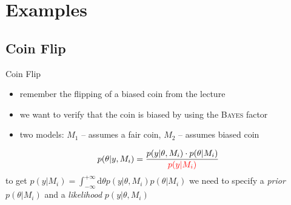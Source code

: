 \documentclass[11pt,aspectratio=1610,dvipsnames]{beamer}
\begin{document}
\section{Examples}

\subsection{Coin Flip}
\begin{frame}{Coin Flip }
	\begin{itemize}
		\item remember the flipping of a biased coin from the lecture
		\item we want to verify that the coin is biased by using the \textsc{Bayes} factor
		\item two models: $M_1$ -- assumes a fair coin, $M_2$ -- assumes biased coin
	\end{itemize}
	\begin{tcolorbox}[colback=black!5,colframe=gray!15!black,title=Posterior of the coin flip problem]
		\begin{equation}
			p(\theta|y,M_i)=\frac{p(y|\theta,M_i)\cdot p(\theta|M_i)}{\color{red}p(y|M_i)}
		\end{equation}
		to get $p(y|M_i)=\int_{-\infty}^{+\infty}\text{d}{\theta} p(y|{\theta},M_i)p({\theta}|M_i)$ we need to specify a \emph{prior} $p({\theta}|M_i)$ and a \emph{likelihood}  $p(y|{\theta},M_i)$
	\end{tcolorbox}
\end{frame}
\end{document}
